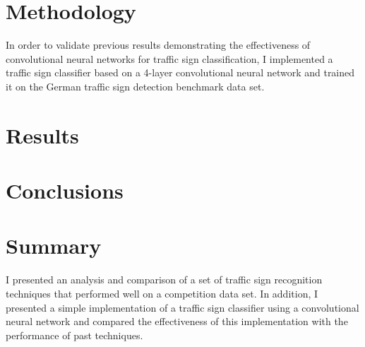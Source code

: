 \documentclass[letterpaper,twocolumn,10pt]{article}
\begin{document}
\section{Methodology}

In order to validate previous results demonstrating the effectiveness of convolutional neural networks for traffic sign classification, I implemented a traffic sign classifier based on a 4-layer convolutional neural network and trained it on the German traffic sign detection benchmark data set. 


\section{Results}


\section{Conclusions}


\section{Summary}

I presented an analysis and comparison of a set of traffic sign recognition techniques that performed well on a competition data set. In addition, I presented a simple implementation of a traffic sign classifier using a convolutional neural network and compared the effectiveness of this implementation with the performance of past techniques.


{\footnotesize 
}
\end{document}
